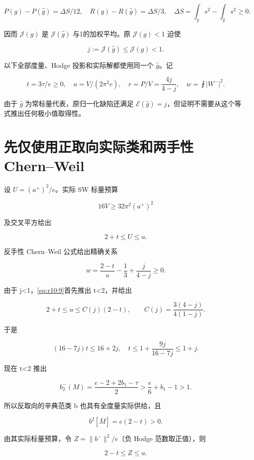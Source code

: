 \documentclass[UTF8,11pt,openany,oneside,fontset=none]{ctexbook}
\begin{document}
\[
P(g)-P(\hat g)=\Delta S/12,\quad
R(g)-R(\hat g)=\Delta S/3,
\quad\Delta S=\int_gs^2-\int_{\hat g}s^2\ge0.
\]

因而 \(\mathcal J(g)\) 是 \(\mathcal J(\hat g)\) 与1的加权平均。原 \(\mathcal J(g)<1\) 迫使

\[
j:=\mathcal J(\hat g)\le\mathcal J(g)<1.
\tag{10.6}\label{eq:r10:6}
\]

以下全部度量、Hodge 投影和实际解都使用同一个 \(\hat g\)。记

\[
t=3\tau/e\ge0,\quad u=V/(2\pi^2e),\quad
r=P/V=\frac{4j}{4-j},\quad
w=\fint|W^-|^2.
\tag{10.7}\label{eq:r10:7}
\]

由于 \(\hat g\) 为常标量代表，原归一化缺陷还满足 \(\mathcal E(\hat g)=j\)，但证明不需要从这个等式推出任何极小值取得性。

\section{先仅使用正取向实际类和两手性 Chern--Weil}\label{ch10:ux5148ux4ec5ux4f7fux7528ux6b63ux53d6ux5411ux5b9eux9645ux7c7bux548cux4e24ux624bux6027-chernweil}

设 \(U=(a^+)^2/e\)。实际 SW 标量预算

\[
16V\ge32\pi^2(a^+)^2
\]

及交叉平方给出

\[
2+t\le U\le u.
\tag{10.8}\label{eq:r10:8}
\]

反手性 Chern--Weil 公式给出精确关系

\[
\boxed{w=\frac{2-t}{u}-\frac13+\frac{j}{4-j}\ge0.}
\tag{10.9}\label{eq:r10:9}
\]

由于 j\textless1，\eqref{eq:r10:9}首先推出 t\textless2，并给出

\[
2+t\le u\le C(j)(2-t),\qquad
C(j)=\frac{3(4-j)}{4(1-j)}.
\tag{10.10}\label{eq:r10:10}
\]

于是

\[
(16-7j)t\le16+2j,
\quad
\boxed{t\le1+\frac{9j}{16-7j}\le1+j.}
\tag{10.11}\label{eq:r10:11}
\]

现在 t\textless2 推出

\[
b_2^-(M)=\frac{e-2+2b_1-\tau}{2}
>\frac e6+b_1-1>1.
\]

所以反取向的辛典范类 b 也具有全度量实际供给，且

\[
b^2[\bar M]=e(2-t)>0.
\]

由其实际标量预算，令 \(Z=\|b^-\|^2/e\)（负 Hodge 范数取正值），则

\[
2-t\le Z\le u.
\tag{10.12}\label{eq:r10:12}
\]
\end{document}
